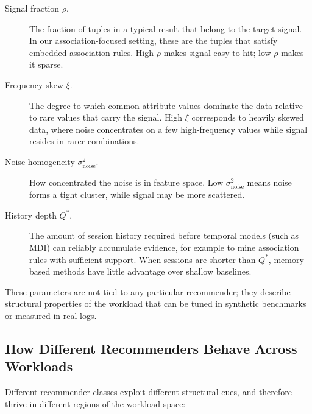 \begin{description}
  \item[Signal fraction $\rho$.]
    The fraction of tuples in a typical result that belong to the target signal. In our association-focused setting, these are the tuples that satisfy embedded association rules. High $\rho$ makes signal easy to hit; low $\rho$ makes it sparse.

  \item[Frequency skew $\xi$.]
    The degree to which common attribute values dominate the data relative to rare values that carry the signal. High $\xi$ corresponds to heavily skewed data, where noise concentrates on a few high-frequency values while signal resides in rarer combinations.

  \item[Noise homogeneity $\sigma^2_{\text{noise}}$.]
    How concentrated the noise is in feature space. Low $\sigma^2_{\text{noise}}$ means noise forms a tight cluster, while signal may be more scattered.

  \item[History depth $Q^*$.]
    The amount of session history required before temporal models (such as MDI) can reliably accumulate evidence, for example to mine association rules with sufficient support. When sessions are shorter than $Q^*$, memory-based methods have little advantage over shallow baselines.
\end{description}

These parameters are not tied to any particular recommender; they describe structural properties of the workload that can be tuned in synthetic benchmarks or measured in real logs.

\vspace{-0.5em}
\subsection{How Different Recommenders Behave Across Workloads}
\label{sec:theory:behaviour}

Different recommender classes exploit different structural cues, and therefore thrive in different regions of the workload space:

